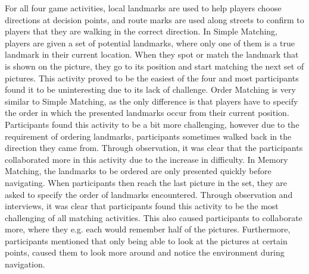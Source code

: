 For all four game activities, local landmarks are used to help players choose directions at decision points, and route marks are used along streets to confirm to players that they are walking in the correct direction. In Simple Matching, players are given a set of potential landmarks, where only one of them is a true landmark in their current location. When they spot or match the landmark that is shown on the picture, they go to its position and start matching the next set of pictures. This activity proved to be the easiest of the four and most participants found it to be uninteresting due to its lack of challenge. Order Matching is very similar to Simple Matching, as the only difference is that players have to specify the order in which the presented landmarks occur from their current position. Participants found this activity to be a bit more challenging, however due to the requirement of ordering landmarks, participants sometimes walked back in the direction they came from. Through observation, it was clear that the participants collaborated more in this activity due to the increase in difficulty. In Memory Matching, the landmarks to be ordered are only presented quickly before navigating. When participants then reach the last picture in the set, they are asked to specify the order of landmarks encountered. Through observation and interviews, it was clear that participants found this activity to be the most challenging of all matching activities. This also caused participants to collaborate more, where they e.g. each would remember half of the pictures. Furthermore, participants mentioned that only being able to look at the pictures at certain points, caused them to look more around and notice the environment during navigation.

